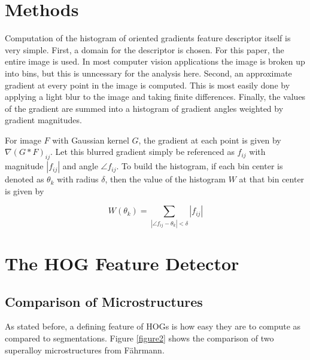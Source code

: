 \documentclass[review]{elsarticle}
\begin{document}
	\section{Methods}\label{methodsandmaterials}
		Computation of the histogram of oriented gradients feature descriptor itself is very simple. First, a domain for the descriptor is chosen. For this paper, the entire image is used. In most computer vision applications the image is broken up into bins, but this is unncessary for the analysis here. Second, an approximate gradient at every point in the image is computed. This is most easily done by applying a light blur to the image and taking finite differences. Finally, the values of the gradient are summed into a histogram of gradient angles weighted by gradient magnitudes.

		For image $F$ with Gaussian kernel $G$, the gradient at each point is given by $\nabla \left( G \ast F \right)_{ij}$. Let this blurred gradient simply be referenced as $f_{ij}$ with magnitude $\left| f_{ij} \right|$ and angle $\angle f_{ij}$. To build the histogram, if each bin center is denoted as $\theta_k$ with radius $\delta$, then the value of the histogram $W$ at that bin center is given by

		\begin{equation}
			W \left( \theta_k \right) = \sum_{\left| \angle f_{ij} - \theta_k \right| < \delta} \left| f_{ij} \right|
		\end{equation}

	\section{The HOG Feature Detector}\label{hog}
	\subsection{Comparison of Microstructures}
	As stated before, a defining feature of HOGs is how easy they are to compute as compared to segmentations. Figure \ref{figure2} shows the comparison of two superalloy microstructures from F\"ahrmann\cite{faehrmann}.
\end{document}
